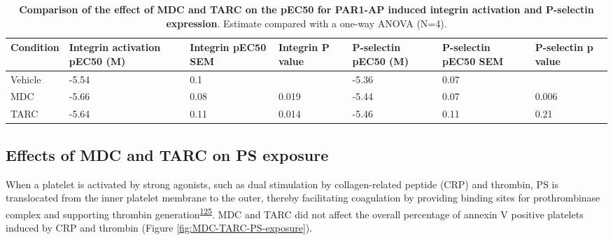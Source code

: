 \documentclass[11pt,twoside]{bristolthesis}
\begin{document}
\begin{landscape}\begin{table}

\caption[Comparison of the effect of MDC and TARC on the pEC50 for PAR1-AP induced integrin activation and P-selectin expression]{\label{tab:chemokines-integrin-pselectin}\textbf{Comparison of the effect of MDC and TARC on the pEC50 for PAR1-AP induced integrin activation and P-selectin expression}. Estimate compared with a one-way ANOVA (N=4).}
\centering
\begin{tabu} to 
\toprule
Condition & Integrin activation pEC50 (M) & Integrin pEC50 SEM & Integrin P value & P-selectin pEC50 (M) & P-selectin pEC50 SEM & P-selectin p value\\
\midrule
Vehicle & -5.54 & 0.1 &  & -5.36 & 0.07 & \\
MDC & -5.66 & 0.08 & 0.019 & -5.44 & 0.07 & 0.006\\
TARC & -5.64 & 0.11 & 0.014 & -5.46 & 0.11 & 0.21\\
\bottomrule
\end{tabu}
\end{table}
\end{landscape}
\hypertarget{effects-of-mdc-and-tarc-on-ps-exposure}{%
\subsection{Effects of MDC and TARC on PS exposure}\label{effects-of-mdc-and-tarc-on-ps-exposure}}

When a platelet is activated by strong agonists, such as dual stimulation by collagen-related peptide (CRP) and thrombin, PS is translocated from the inner platelet membrane to the outer, thereby facilitating coagulation by providing binding sites for prothrombinase complex and supporting thrombin generation\textsuperscript{\protect\hyperlink{ref-Reddy2020}{125}}. MDC and TARC did not affect the overall percentage of annexin V positive platelets induced by CRP and thrombin (Figure \ref{fig:MDC-TARC-PS-exposure}).
\end{document}
